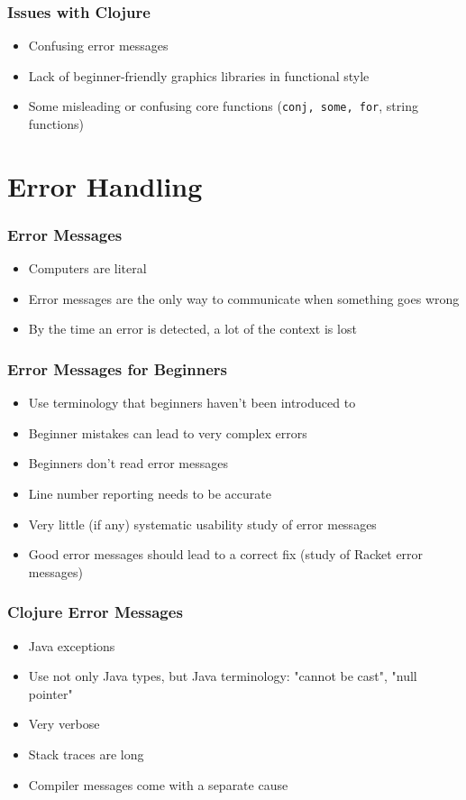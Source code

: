 \documentclass{beamer}
\begin{document}
\begin{frame}
	\frametitle{Issues with Clojure}
	\begin{itemize}
		\item Confusing error messages
		\item Lack of beginner-friendly graphics libraries in functional style
		\item Some misleading or confusing core functions ({\tt conj, some, for}, string functions)  
	\end{itemize}
\end{frame}

\section{Error Handling}

\begin{frame}
	\frametitle{Error Messages}
	\begin{itemize}
		\item Computers are literal
		\item Error messages are the only way to communicate when something goes wrong
		\item By the time an error is detected, a lot of the context is lost
	\end{itemize}
\end{frame}

\begin{frame}
	\frametitle{Error Messages for Beginners}
	\begin{itemize}
		\item Use terminology that beginners haven't been introduced to
		\item Beginner mistakes can lead to very complex errors
		\item Beginners don't read error messages
		\item Line number reporting needs to be accurate
		\item Very little (if any) systematic usability study of error messages		
		\item Good error messages should lead to a correct fix (study of Racket error messages)
		
	\end{itemize}
\end{frame}

\begin{frame}
	\frametitle{Clojure Error Messages}
	\begin{itemize}
		\item Java exceptions
		\item Use not only Java types, but Java terminology: "cannot be cast", "null pointer"
		\item Very verbose
		\item Stack traces are long
		\item Compiler messages come with a separate cause
	\end{itemize}
\end{frame}
\end{document}
